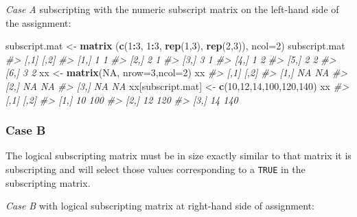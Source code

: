 \documentclass[
]{book}
\newenvironment{Shaded}{\begin{snugshade}}{\end{snugshade}}
\newcommand{\AttributeTok}[1]{\textcolor[rgb]{0.13,0.29,0.53}{#1}}
\newcommand{\CommentTok}[1]{\textcolor[rgb]{0.56,0.35,0.01}{\textit{#1}}}
\newcommand{\ConstantTok}[1]{\textcolor[rgb]{0.56,0.35,0.01}{#1}}
\newcommand{\DecValTok}[1]{\textcolor[rgb]{0.00,0.00,0.81}{#1}}
\newcommand{\FunctionTok}[1]{\textcolor[rgb]{0.13,0.29,0.53}{\textbf{#1}}}
\newcommand{\NormalTok}[1]{#1}
\newcommand{\OtherTok}[1]{\textcolor[rgb]{0.56,0.35,0.01}{#1}}
\newcommand{\SpecialCharTok}[1]{\textcolor[rgb]{0.81,0.36,0.00}{\textbf{#1}}}
\begin{document}
\emph{Case A} subscripting with the numeric subscript matrix on the left-hand side of the assignment:

\begin{Shaded}
\begin{Highlighting}[]
\NormalTok{subscript.mat }\OtherTok{\textless{}{-}} \FunctionTok{matrix}\NormalTok{ (}\FunctionTok{c}\NormalTok{(}\DecValTok{1}\SpecialCharTok{:}\DecValTok{3}\NormalTok{, }\DecValTok{1}\SpecialCharTok{:}\DecValTok{3}\NormalTok{, }\FunctionTok{rep}\NormalTok{(}\DecValTok{1}\NormalTok{,}\DecValTok{3}\NormalTok{), }\FunctionTok{rep}\NormalTok{(}\DecValTok{2}\NormalTok{,}\DecValTok{3}\NormalTok{)), }\AttributeTok{ncol=}\DecValTok{2}\NormalTok{)}
\NormalTok{subscript.mat}
\CommentTok{\#\textgreater{}      [,1] [,2]}
\CommentTok{\#\textgreater{} [1,]    1    1}
\CommentTok{\#\textgreater{} [2,]    2    1}
\CommentTok{\#\textgreater{} [3,]    3    1}
\CommentTok{\#\textgreater{} [4,]    1    2}
\CommentTok{\#\textgreater{} [5,]    2    2}
\CommentTok{\#\textgreater{} [6,]    3    2}
\NormalTok{xx }\OtherTok{\textless{}{-}} \FunctionTok{matrix}\NormalTok{(}\ConstantTok{NA}\NormalTok{, }\AttributeTok{nrow=}\DecValTok{3}\NormalTok{,}\AttributeTok{ncol=}\DecValTok{2}\NormalTok{)}
\NormalTok{xx }
\CommentTok{\#\textgreater{}      [,1] [,2]}
\CommentTok{\#\textgreater{} [1,]   NA   NA}
\CommentTok{\#\textgreater{} [2,]   NA   NA}
\CommentTok{\#\textgreater{} [3,]   NA   NA}
\NormalTok{xx[subscript.mat] }\OtherTok{\textless{}{-}} \FunctionTok{c}\NormalTok{(}\DecValTok{10}\NormalTok{,}\DecValTok{12}\NormalTok{,}\DecValTok{14}\NormalTok{,}\DecValTok{100}\NormalTok{,}\DecValTok{120}\NormalTok{,}\DecValTok{140}\NormalTok{)}
\NormalTok{xx}
\CommentTok{\#\textgreater{}      [,1] [,2]}
\CommentTok{\#\textgreater{} [1,]   10  100}
\CommentTok{\#\textgreater{} [2,]   12  120}
\CommentTok{\#\textgreater{} [3,]   14  140}
\end{Highlighting}
\end{Shaded}

\subsubsection*{Case B}\label{case-b}

The logical subscripting matrix must be in size exactly similar to that matrix it is subscripting and will select those values corresponding to a \texttt{TRUE} in the subscripting matrix.

\emph{Case B} with logical subscripting matrix at right-hand side of assignment:
\end{document}
